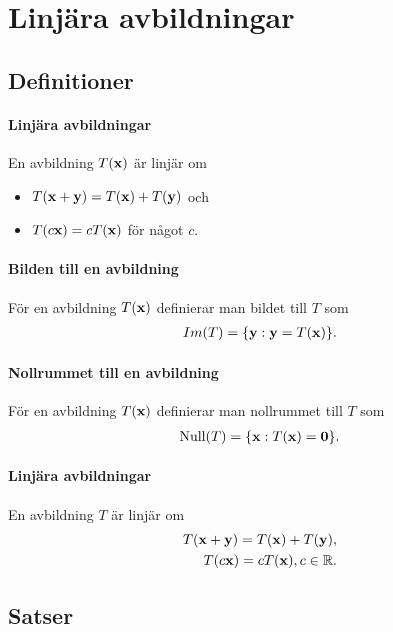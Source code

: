 \section{Linjära avbildningar}

\subsection{Definitioner}

\paragraph{Linjära avbildningar}
En avbildning $T(\vect{x})$ är linjär om
\begin{itemize}
	\item $T(\vect{x} + \vect{y}) = T(\vect{x}) + T(\vect{y})$ och
	\item $T(c\vect{x}) = cT(\vect{x})$ för något $c$.
\end{itemize}

\paragraph{Bilden till en avbildning}
För en avbildning $T(\vect{x})$ definierar man bildet till $T$ som
\begin{align*}
	Im(T) = \{\vect{y} : \vect{y} = T(\vect{x})\}.
\end{align*}

\paragraph{Nollrummet till en avbildning}
För en avbildning $T(\vect{x})$ definierar man nollrummet till $T$ som
\begin{align*}
	\text{Null}(T) = \{\vect{x} : T(\vect{x})= \vect{0}\}.
\end{align*}

\paragraph{Linjära avbildningar}
En avbildning $T$ är linjär om
\begin{align*}
	T(\vect{x} + \vect{y}) = T(\vect{x}) + T(\vect{y}), \\
	T(c\vect{x}) = cT(\vect{x}), c\in\R.
\end{align*}

\subsection{Satser}

